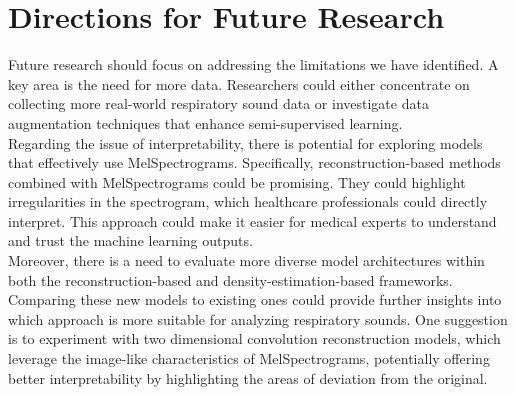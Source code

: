 \section{Directions for Future Research}
Future research should focus on addressing the limitations we have identified. A key area is the need for more data. Researchers could either concentrate on collecting more real-world respiratory sound data or investigate data augmentation techniques that enhance semi-supervised learning.\\
Regarding the issue of interpretability, there is potential for exploring models that effectively use MelSpectrograms. Specifically, reconstruction-based methods combined with MelSpectrograms could be promising. They could highlight irregularities in the spectrogram, which healthcare professionals could directly interpret. This approach could make it easier for medical experts to understand and trust the machine learning outputs.\\
Moreover, there is a need to evaluate more diverse model architectures within both the reconstruction-based and density-estimation-based frameworks. Comparing these new models to existing ones could provide further insights into which approach is more suitable for analyzing respiratory sounds. One suggestion is to experiment with two dimensional convolution reconstruction models, which leverage the image-like characteristics of MelSpectrograms, potentially offering better interpretability by highlighting the areas of deviation from the original.

